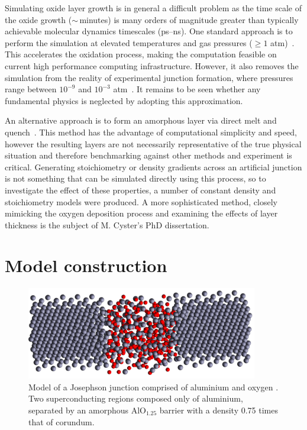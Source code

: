 Simulating oxide layer growth is in general a difficult problem as the time scale of the oxide growth ($\sim\,$minutes) is many orders of magnitude greater than typically achievable molecular dynamics timescales (ps--ns).
One standard approach is to perform the simulation at elevated temperatures and gas pressures ($\ge 1$ atm)~\cite{Campbell1999, Zhou2005, Hasnaoui2005}.
This accelerates the oxidation process, making the computation feasible on current high performance computing infrastructure.
However, it also removes the simulation from the reality of experimental junction formation, where pressures range between $10^{-9}$ and $10^{-3}$ atm~\cite{Morohashi1987, Kohlstedt1993, Jeurgens2002}.
It remains to be seen whether any fundamental physics is neglected by adopting this approximation.

An alternative approach is to form an amorphous layer via direct melt and quench~\cite{Vashishta2008,Sheng2012}.
This method has the advantage of computational simplicity and speed, however the resulting layers are not necessarily representative of the true physical situation and therefore benchmarking against other methods and experiment is critical.
Generating stoichiometry or density gradients across an artificial junction is not something that can be simulated directly using this process, so to investigate the effect of these properties, a number of constant density and stoichiometry models were produced. A more sophisticated method, closely mimicking the oxygen deposition process and examining the effects of layer thickness is the subject of M. Cyster's PhD dissertation.

\section{Model construction}\label{sec:model}
\begin{figure}[htp]
\includegraphics[width=0.9\textwidth]{figures/AlO125_075}
\caption[Atomistic Josephson Junction Model]{\label{fig:povray}Model of a Josephson junction comprised of aluminium  and oxygen . Two superconducting regions composed only of aluminium, separated by an amorphous AlO$_{1.25}$ barrier with a density 0.75 times that of corundum.}%
\end{figure}

